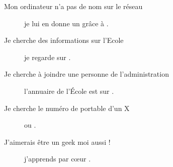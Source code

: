 \begin{description}
\item[Mon ordinateur n'a pas de nom sur le réseau] je lui en donne un gr\^ace \`a  .

\item[Je cherche des informations sur l'Ecole] je regarde sur .

\item[Je cherche à joindre une personne de l'administration] l'annuaire de l'École est sur \linebreak{} .

\item[Je cherche le numéro de portable d'un X] \fkz ou .

\item[J'aimerais être un geek moi aussi !] j'apprends par c\oe ur .

\end{description}
